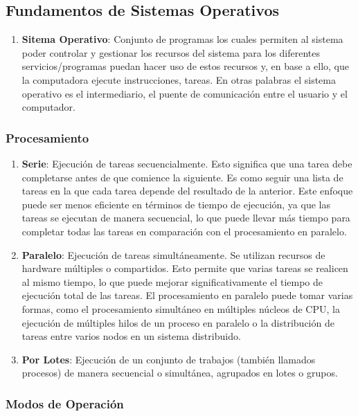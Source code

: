 \documentclass[12pt, a4paper]{article} %
\begin{document}
\subsection{Fundamentos de Sistemas Operativos}

\begin{enumerate}
	\item \textbf{Sitema Operativo}: Conjunto de programas los cuales permiten al sistema poder controlar y gestionar los recursos del sistema para los diferentes servicios/programas puedan hacer uso de estos recursos y, en base a ello, que la computadora ejecute instrucciones, tareas. En otras palabras el sistema operativo es el intermediario, el puente de comunicación entre el usuario y el computador.
\end{enumerate}

\subsubsection{Procesamiento}

\begin{enumerate}[resume*]
	\item \textbf{Serie}: Ejecución de tareas secuencialmente. Esto significa que una tarea debe completarse antes de que comience la siguiente. Es como seguir una lista de tareas en la que cada tarea depende del resultado de la anterior. Este enfoque puede ser menos eficiente en términos de tiempo de ejecución, ya que las tareas se ejecutan de manera secuencial, lo que puede llevar más tiempo para completar todas las tareas en comparación con el procesamiento en paralelo.

	\item \textbf{Paralelo}: Ejecución de tareas simultáneamente. Se utilizan recursos de hardware múltiples o compartidos. Esto permite que varias tareas se realicen al mismo tiempo, lo que puede mejorar significativamente el tiempo de ejecución total de las tareas. El procesamiento en paralelo puede tomar varias formas, como el procesamiento simultáneo en múltiples núcleos de CPU, la ejecución de múltiples hilos de un proceso en paralelo o la distribución de tareas entre varios nodos en un sistema distribuido.

	\item \textbf{Por Lotes}: Ejecución de un conjunto de trabajos (también llamados procesos) de manera secuencial o simultánea, agrupados en lotes o grupos.
\end{enumerate}

\subsubsection{Modos de Operación}
\end{document}

